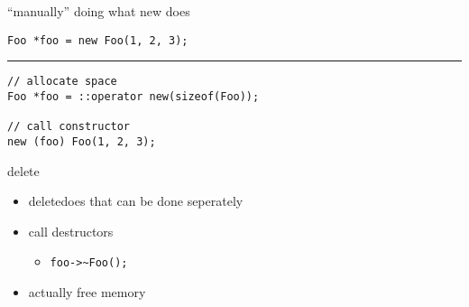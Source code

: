 \begin{frame}[fragile,label=placementNew]{``manually'' doing what new does}
\lstset{language=C++}
\begin{lstlisting}
Foo *foo = new Foo(1, 2, 3);
\end{lstlisting}
\hrule
\begin{lstlisting}
// allocate space
Foo *foo = ::operator new(sizeof(Foo));

// call constructor
new (foo) Foo(1, 2, 3);
\end{lstlisting}
\end{frame}

\begin{frame}[fragile,label=deleteParts]{delete}
\lstset{language=C++}
\begin{itemize}
    \item deletedoes  that can be done seperately
    \vspace{.5cm}
    \item call destructors
        \begin{itemize}
        \item \lstinline|foo->~Foo();|
        \end{itemize}
    \item actually free memory
        \begin{itemize}
        \end{itemize}
\end{itemize}
\end{frame}
